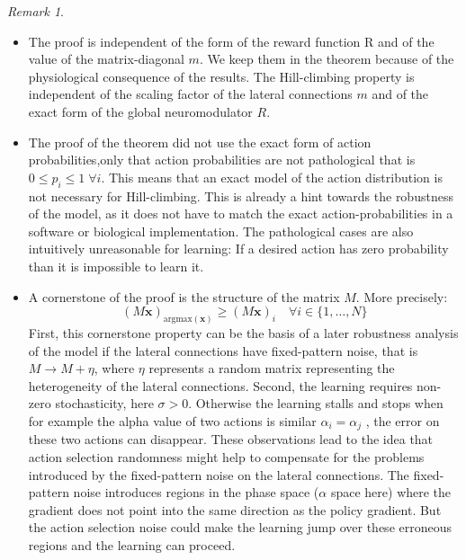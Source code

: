 \documentclass{article}
\theoremstyle{remark}
\newtheorem*{remark}{Remark}
\begin{document}
\begin{remark}
    \begin{itemize}
        \item
            The proof is independent of the form of the reward function R and of the value of the matrix-diagonal $m$.
            We keep them in the theorem because of the physiological consequence of the results.
            The Hill-climbing property is independent of the scaling factor of the lateral connections $m$ and of the exact form of the global neuromodulator $R$.
        \item
            The proof of the theorem did not use the exact form of action probabilities,only that action probabilities are not pathological that is $0 \leq p_i \leq 1 \; \forall i$.
            This means that an exact model of the action distribution is not necessary for Hill-climbing.
            This is already a hint towards the robustness of the model, as it does not have to match the exact action-probabilities in a software or biological implementation.
            The pathological cases are also intuitively unreasonable for learning: If a desired action has zero probability than it is impossible to learn it.
        \item
            A cornerstone of the proof is the structure of the matrix $M$. More precisely:
                \begin{equation}
                 (M\mathbf{x})_{\mathrm{argmax}(\mathbf{x})} \geq (M\mathbf{x})_i \quad \forall i \in \{ 1, \dots, N \}
                \end{equation}
First, this cornerstone property can be the basis of a later robustness
analysis of the model if the lateral connections have fixed-pattern noise,
that is $M \rightarrow M + \eta$, where $\eta$ represents a random matrix representing
the heterogeneity of the lateral connections. Second, the learning requires
non-zero stochasticity, here $\sigma > 0$. Otherwise the learning stalls and stops
when for example the alpha value of two actions is similar $\alpha_i = \alpha_j$ , the
error on these two actions can disappear. These observations lead to the
idea that action selection randomness might help to compensate for the
problems introduced by the fixed-pattern noise on the lateral connections.
The fixed-pattern noise introduces regions in the phase space ($\alpha$ space
here) where the gradient does not point into the same direction as the
policy gradient. But the action selection noise could make the learning jump over these erroneous regions and the learning can proceed.

    \end{itemize}
\end{remark}
\end{document}
